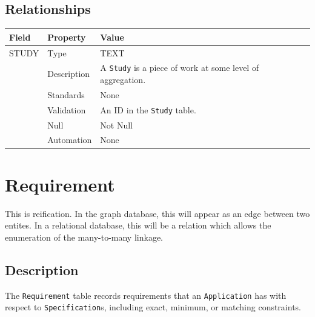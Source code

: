\documentclass[
]{article}
\newcounter{none} %
\begin{document}
\subsection{Relationships}\label{relationships-22}

{\def\LTcaptype{none} %
\begin{longtable}[]{@{}
  >{\raggedright\arraybackslash}p{}
  >{\raggedright\arraybackslash}p{}
  >{\raggedright\arraybackslash}p{}@{}}
\toprule\noalign{}
\begin{minipage}[b]{\linewidth}\raggedright
Field
\end{minipage} & \begin{minipage}[b]{\linewidth}\raggedright
Property
\end{minipage} & \begin{minipage}[b]{\linewidth}\raggedright
Value
\end{minipage} \\
\midrule\noalign{}
\endhead
\bottomrule\noalign{}
\endlastfoot
STUDY & Type & TEXT \\
& Description & A \texttt{Study} is a piece of work at some level of
aggregation. \\
& Standards & None \\
& Validation & An ID in the \texttt{Study} table. \\
& Null & Not Null \\
& Automation & None \\
\end{longtable}
}

\section{Requirement}\label{requirement}

This is reification. In the graph database, this will appear as an edge
between two entites. In a relational database, this will be a relation
which allows the enumeration of the many-to-many linkage.

\subsection{Description}\label{description-26}

The \texttt{Requirement} table records requirements that an
\texttt{Application} has with respect to \texttt{Specification}s,
including exact, minimum, or matching constraints.
\end{document}
